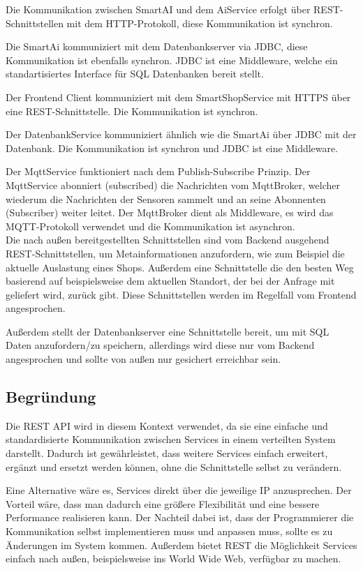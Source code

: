 \documentclass[runningheads]{llncs}
\begin{document}
Die Kommunikation zwischen SmartAI und dem AiService erfolgt über REST-Schnittstellen mit dem HTTP-Protokoll, diese Kommunikation ist synchron.

Die SmartAi kommuniziert mit dem Datenbankserver via JDBC, diese Kommunikation ist ebenfalls synchron. JDBC ist eine Middleware, welche ein standartisiertes Interface für SQL Datenbanken bereit stellt.

Der Frontend Client kommuniziert mit dem SmartShopService mit HTTPS über eine REST-Schnittstelle. Die Kommunikation ist synchron.

Der DatenbankService kommuniziert ähnlich wie die SmartAi über JDBC mit der Datenbank. Die Kommunikation ist synchron und JDBC ist eine Middleware.

Der MqttService funktioniert nach dem Publish-Subscribe Prinzip. Der MqttService abonniert (subscribed) die Nachrichten vom MqttBroker, welcher wiederum die Nachrichten der Sensoren sammelt und an seine Abonnenten (Subscriber) weiter leitet.
Der MqttBroker dient als Middleware, es wird das MQTT-Protokoll verwendet und die Kommunikation ist asynchron. \\

Die nach außen bereitgestellten Schnittstellen sind vom Backend ausgehend REST-Schnittstellen, um Metainformationen anzufordern, wie zum Beispiel die aktuelle Auslastung eines Shops.
Außerdem eine Schnittstelle die den besten Weg basierend auf beispielsweise dem aktuellen Standort, der bei der Anfrage mit geliefert wird, zurück gibt.
Diese Schnittstellen werden im Regelfall vom Frontend angesprochen.

Außerdem stellt der Datenbankserver eine Schnittstelle bereit, um mit SQL Daten anzufordern/zu speichern, allerdings wird diese nur vom Backend angesprochen und sollte von außen nur gesichert erreichbar sein. \\

\subsection{Begründung}
Die REST API wird in diesem Kontext verwendet, da sie eine einfache und standardisierte Kommunikation zwischen Services in einem verteilten System darstellt.
Dadurch ist gewährleistet, dass weitere Services einfach erweitert, ergänzt und ersetzt werden können, ohne die Schnittstelle selbst zu verändern.

Eine Alternative wäre es, Services direkt über die jeweilige IP anzusprechen.
Der Vorteil wäre, dass man dadurch eine größere Flexibilität und eine bessere Performance realisieren kann.
Der Nachteil dabei ist, dass der Programmierer die Kommunikation selbst implementieren muss und anpassen muss, sollte es zu Änderungen im System kommen.
Außerdem bietet REST die Möglichkeit Services einfach nach außen, beispielsweise ins World Wide Web, verfügbar zu machen.
\end{document}
